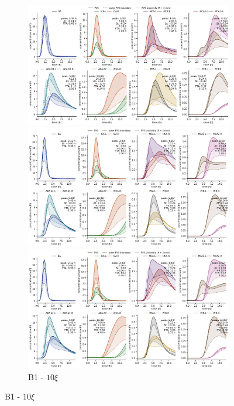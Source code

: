 \begin{figure}
\begin{subfigure}{0.5 \linewidth}
    \centering
    \includegraphics[width=1\linewidth]{figures/modelA_conc_at_label.png}
    \caption{B1 - $\xi$}
    \includegraphics[width=1\linewidth]{figures/modelB1-10_conc_at_label.png}
    \caption{B1 - $10 \xi$}
    \includegraphics[width=1\linewidth]{figures/modelB1-100_conc_at_label.png}

\end{subfigure}
\end{figure}
